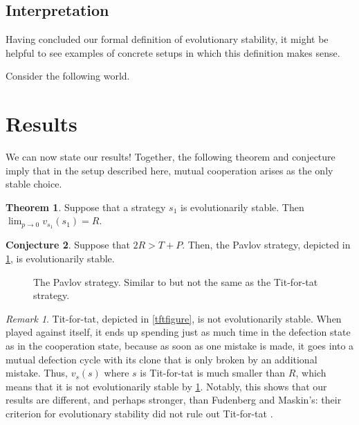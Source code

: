 \documentclass[11pt]{amsart}
\theoremstyle{definition}
\newtheorem{theorem}{Theorem}[section]
\newtheorem{conjecture}[theorem]{Conjecture}
\theoremstyle{remark}
\newtheorem*{remark}{Remark}
\begin{document}
\subsection{Interpretation}

Having concluded our formal definition of evolutionary stability, it might be helpful to see examples of concrete setups in which this definition makes sense.

Consider the following world. 



\section{Results}
\label{sectionresults}

We can now state our results! Together, the following theorem and conjecture imply that in the setup described here, mutual cooperation arises as the only stable choice.

\begin{theorem}
  \label{evolutionarystable1}
  Suppose that a strategy $s_1$ is evolutionarily stable. Then $\lim_{p \to 0} v_{s_1}(s_1) = R$.
\end{theorem}

\begin{conjecture}
  \label{pavlovtheorem}
  Suppose that $2R > T + P$. Then, the Pavlov strategy, depicted in \cref{pavlovfigure}, is evolutionarily stable.
\end{conjecture}

\begin{figure}
  \centering
  \caption{The Pavlov strategy. Similar to but not the same as the Tit-for-tat strategy.}
  \label{pavlovfigure}
\end{figure}


\begin{remark}
  Tit-for-tat, depicted in \cref{tftfigure}, is not evolutionarily stable. 
  When played against itself, it ends up spending just as much time in the defection state as in the cooperation state, because as soon as one mistake is made, it goes into a mutual defection cycle with its clone that is only broken by an additional mistake.
  Thus, $v_s(s)$ where $s$ is Tit-for-tat is much smaller than $R$, which means that it is not evolutionarily stable by \cref{evolutionarystable1}. Notably, this shows that our results are different, and perhaps stronger, than Fudenberg and Maskin's: their criterion for evolutionary stability did not rule out Tit-for-tat \cite{fundenberg1990evolution}.
\end{remark}
\end{document}
